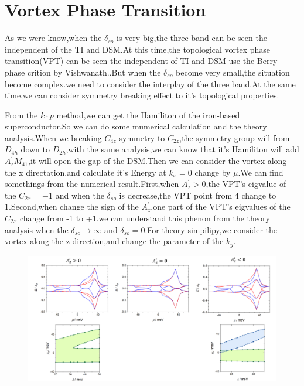 \documentclass[5pt]{article}
\begin{document}
\section{Vortex Phase Transition}
As we were know,when the $\delta_{so}$ is very big,the three band can be seen the independent of the TI and DSM.At this time,the topological vortex phase transition(VPT) can be seen the independent of TI and DSM use the Berry phase crition by Vishwanath.\cite{PhysRevLett.107.097001}.But when the $\delta_{so}$ become very small,the situation become complex.we need to consider the interplay of the three band.At the same time,we can consider symmetry breaking effect to it's topological properties.
\par 
From the $k\cdot p$ method,we can get the Hamiliton of the iron-based superconductor.So we can do some mumerical calculation and the theory analysis.When we breaking $C_{4z}$ symmetry to $C_{2z}$,the symmetry group will from $D_{4h}$ down to $D_{2h}$,with the same analysis,we can know that it's Hamiliton will add $A_{z}^{'}M_{41}$,it will open the gap of the DSM.Then we can consider the vortex along the x directation,and calculate it's Energy at $k_x=0$ change by $\mu$.We can find somethings from the numerical result.First,when $A_z^{'}>0$,the VPT's eigvalue of the $C_{2x}=-1$ and when the $\delta_{so}$ is decrease,the VPT point from 4 change to 1.Second,when change the sign of the $A_{z}^{'}$,one part of the VPT's eigvalues of the $C_{2x}$ change from -1 to +1.we can understand this phenon from the theory analysis when the $\delta_{so}\rightarrow \infty$ and $\delta_{so}=0$.For theory simpilipy,we consider the vortex along the z direction,and change the parameter of the $k_y$.
\par 

\begin{figure}[H]
	\centering
	\includegraphics[scale=0.5]{figure/5}
	\caption{}
	\label{}
\end{figure}
\end{document}
